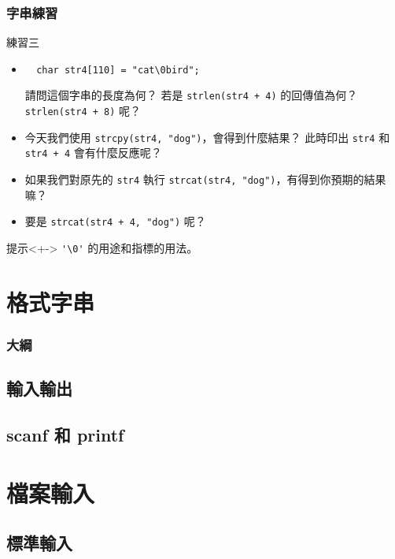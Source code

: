 \documentclass[utf8]{beamer}
\begin{document}
\begin{CJK}{UTF8}{bkai}
\begin{frame}[fragile]
  \frametitle{字串練習}
  \begin{block}{練習三}
    \begin{itemize}[<+->]
    \item
      \begin{lstlisting}
  char str4[110] = "cat\0bird";
      \end{lstlisting}
      請問這個字串的長度為何？\onslide<+-> 若是 \lstinline{strlen(str4 + 4)}{} 的回傳值為何？\onslide<+-> \lstinline{strlen(str4 + 8)}{} 呢？
    \item 今天我們使用 \lstinline{strcpy(str4, "dog")}{}，會得到什麼結果？\onslide<+-> 此時印出 \lstinline{str4}{} 和 \lstinline{str4 + 4}{} 會有什麼反應呢？
    \item 如果我們對原先的 \lstinline{str4}{} 執行 \lstinline{strcat(str4, "dog")}{}，有得到你預期的結果嘛？
    \item 要是 \lstinline{strcat(str4 + 4, "dog")}{} 呢？ 
    \end{itemize}
  \end{block}
  \begin{exampleblock}{提示}<+->
  \lstinline{'\0'}{} 的用途和指標的用法。
  \end{exampleblock}
\end{frame}

\section{格式字串}
\begin{frame}
  \frametitle{大綱}
  \begin{multicols}{2}
    \tableofcontents[currentsection]
  \end{multicols}
\end{frame}

\subsection{輸入輸出}

\subsection{scanf 和 printf}

\section{檔案輸入}

\subsection{標準輸入}


\end{CJK}
\end{document}
